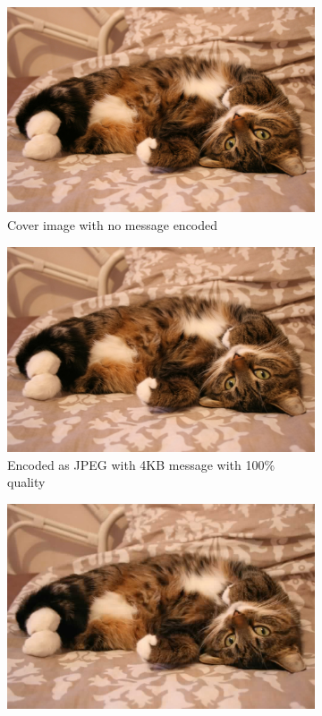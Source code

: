 \begin{figure}[H]
    \centering
    \begin{subfigure}[b]{0.45\textwidth}
        \includegraphics[width=\textwidth]{figures/catToTest.jpg}
        \caption{Cover image with no message encoded}
        \label{fig:catNoMessage}
    \end{subfigure}
    \begin{subfigure}[b]{0.45\textwidth}
        \includegraphics[width=\textwidth]{figures/catToTestHighMessage.jpeg}
        \caption{Encoded as JPEG with 4KB message with 100\% quality}
        \label{fig:catHighMessage}
    \end{subfigure}
    \begin{subfigure}[b]{0.45\textwidth}
        \includegraphics[width=\textwidth]{figures/catToTestNoMessage.jpeg}

\end{subfigure}
\end{figure}
